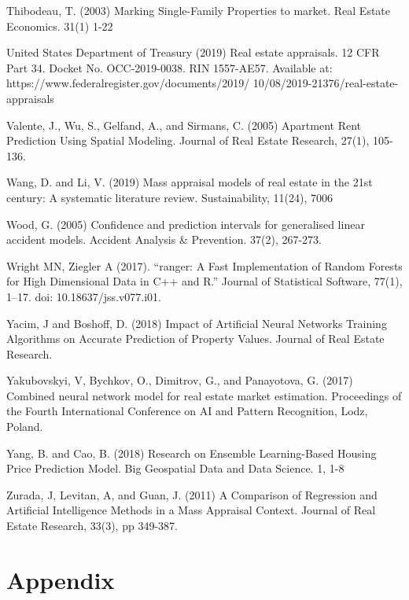 \documentclass[colTwo]{anon}
\theoremstyle{definition}
\begin{document}
\begin{thebibliography}{50}
\harvarditem{}{}{}Thibodeau, T. (2003) Marking Single-Family Properties to market. Real Estate Economics. 31(1) 1-22

\harvarditem{}{}{}United States Department of Treasury (2019) Real estate appraisals. 12 CFR Part 34. Docket No. OCC-2019-0038. RIN 1557-AE57. Available at: https://www.federalregister.gov/documents/2019/ 10/08/2019-21376/real-estate-appraisals

\harvarditem{}{}{}Valente, J., Wu, S., Gelfand, A., and Sirmans, C. (2005) Apartment Rent Prediction Using Spatial Modeling. Journal of Real Estate Research, 27(1), 105-136. 

\harvarditem{}{}{}Wang, D. and Li, V. (2019) Mass appraisal models of real estate in the 21st century: A systematic literature review.  Sustainability, 11(24), 7006

\harvarditem{}{}{}Wood, G. (2005) Confidence and prediction intervals for generalised linear accident models. Accident Analysis \& Prevention. 37(2), 267-273. 

\harvarditem{}{}{}Wright MN, Ziegler A (2017). “ranger: A Fast Implementation of Random Forests for High Dimensional Data in C++ and R.” Journal of Statistical Software, 77(1), 1–17. doi: 10.18637/jss.v077.i01.

\harvarditem{}{}{}Yacim, J and Boshoff, D. (2018) Impact of Artificial Neural Networks Training Algorithms on Accurate Prediction of Property Values. Journal of Real Estate Research. 

\harvarditem{}{}{}Yakubovskyi, V, Bychkov, O., Dimitrov, G., and Panayotova, G.  (2017) Combined neural network model for real estate market estimation. Proceedings of the Fourth International Conference on AI and Pattern Recognition, Lodz, Poland.  

\harvarditem{}{}{}Yang, B. and Cao, B. (2018) Research on Ensemble Learning-Based Housing Price Prediction Model. Big Geospatial Data and Data Science. 1, 1-8

\harvarditem{}{}{}Zurada, J, Levitan, A, and Guan, J. (2011) A Comparison of Regression and Artificial Intelligence Methods in a Mass Appraisal Context. Journal of Real Estate Research, 33(3), pp 349-387. 

\end{thebibliography}

\section{Appendix}
\end{document}

